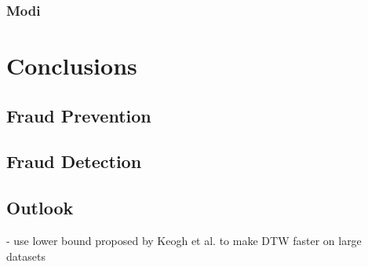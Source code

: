\documentclass[a4paper, oneside]{csthesis}
\begin{document}


\subsection{Modi}















\chapter{Conclusions}

\section{Fraud Prevention}

\section{Fraud Detection}

\section{Outlook}

- use lower bound proposed by Keogh et al.\cite{Keogh:2002:EID:1287369.1287405} to make DTW faster on large datasets














\end{document}
